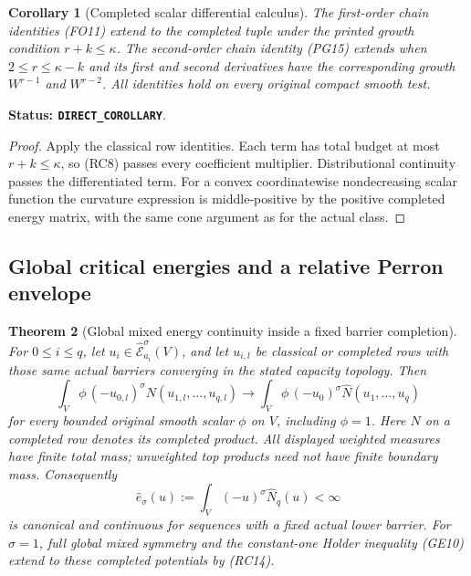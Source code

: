 \documentclass[11pt,a4paper]{article}
\numberwithin{equation}{section}
\newtheorem{theorem}{Theorem}[section]
\newtheorem{corollary}[theorem]{Corollary}
\theoremstyle{definition}
\theoremstyle{remark}
\begin{document}
\begin{corollary}[Completed scalar differential calculus]
\label{cor:r11-barrier-completed-chain}
The first-order chain identities (FO11) extend to the completed
tuple under the printed growth condition $r+k\leq\kappa$.
The second-order chain identity (PG15) extends when
$2\leq r\leq\kappa-k$ and its first and second derivatives
have the corresponding growth $W^{r-1}$ and $W^{r-2}$.
All identities hold on every original compact smooth test.
\end{corollary}

\noindent\textbf{Status: \texttt{DIRECT\_COROLLARY}}.

\begin{proof}
Apply the classical row identities. Each term has total
budget at most $r+k\leq\kappa$, so (RC8) passes every
coefficient multiplier. Distributional continuity passes
the differentiated term. For a convex coordinatewise
nondecreasing scalar function the curvature expression is
middle-positive by the positive completed energy matrix,
with the same cone argument as for the actual class.
\end{proof}

\subsection{Global critical energies and a relative Perron envelope}

\begin{theorem}[Global mixed energy continuity inside a fixed barrier completion]
\label{thm:r11-completed-global-critical-energy}
For $0\leq i\leq q$, let
$u_i\in\widehat{\mathcal E}^{\sigma}_{a_i}(V)$, and let
$u_{i,l}$ be classical or completed rows with those same
actual barriers converging in the stated capacity topology.
Then
\[
 \int_V \phi\,(-u_{0,l})^\sigma
             N(u_{1,l},\ldots,u_{q,l})
   \longrightarrow
 \int_V \phi\,(-u_0)^\sigma
             \widehat N(u_1,\ldots,u_q)
 \tag{RC14}
\]
for every bounded original smooth scalar $\phi$ on $V$,
including $\phi=1$. Here $N$ on a completed row denotes its
completed product. All displayed weighted measures have finite
total mass; unweighted top products need not have finite boundary
mass. Consequently
\[
        \widehat e_\sigma(u)
            :=\int_V(-u)^\sigma\widehat N_q(u)<\infty
 \tag{RC15}
\]
is canonical and continuous for sequences with a fixed actual
lower barrier. For $\sigma=1$, full global mixed symmetry and
the constant-one Holder inequality (GE10) extend to these
completed potentials by (RC14).
\end{theorem}
\end{document}
